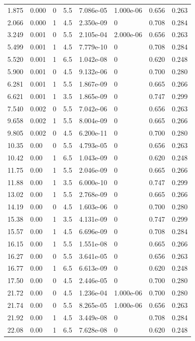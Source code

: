 \documentclass[preview]{standalone}
\begin{document}
{{\begin{tabular}{L{1.2cm}C{1.2cm} C{0.3cm}C{0.5cm} C{1.4cm}C{1.4cm} C{1.4cm}C{1.4cm}}
  1.875  &  0.000  & 0     & 5.5 &  7.086e-05  & 1.000e-06  & 0.656 &  0.263   \\ 
  2.066  &  0.000  & 1     & 4.5 &  2.350e-09  & 0  & 0.708 &  0.284   \\ 
  3.249  &  0.001  & 0     & 5.5 &  2.105e-04  & 2.000e-06  & 0.656 &  0.263   \\ 
  5.499  &  0.001  & 1     & 4.5 &  7.779e-10  & 0  & 0.708 &  0.284   \\ 
  5.520  &  0.001  & 1     & 6.5 &  1.042e-08  & 0  & 0.620 &  0.248   \\ 
  5.900  &  0.001  & 0     & 4.5 &  9.132e-06  & 0  & 0.700 &  0.280   \\ 
  6.281  &  0.001  & 1     & 5.5 &  1.867e-09  & 0  & 0.665 &  0.266   \\ 
  6.621  &  0.001  & 1     & 3.5 &  1.865e-09  & 0  & 0.747 &  0.299   \\ 
  7.540  &  0.002  & 0     & 5.5 &  7.042e-06  & 0  & 0.656 &  0.263   \\ 
  9.658  &  0.002  & 1     & 5.5 &  8.004e-09  & 0  & 0.665 &  0.266   \\ 
  9.805  &  0.002  & 0     & 4.5 &  6.200e-11  & 0  & 0.700 &  0.280   \\ 
  10.35  &  0.00  & 0     & 5.5 &  4.793e-05  & 0  & 0.656 &  0.263   \\ 
  10.42  &  0.00  & 1     & 6.5 &  1.043e-09  & 0  & 0.620 &  0.248   \\ 
  11.75  &  0.00  & 1     & 5.5 &  2.046e-09  & 0  & 0.665 &  0.266   \\ 
  11.88  &  0.00  & 1     & 3.5 &  6.000e-10  & 0  & 0.747 &  0.299   \\ 
  13.02  &  0.00  & 1     & 5.5 &  2.768e-09  & 0  & 0.665 &  0.266   \\ 
  14.19  &  0.00  & 0     & 4.5 &  1.603e-06  & 0  & 0.700 &  0.280   \\ 
  15.38  &  0.00  & 1     & 3.5 &  4.131e-09  & 0  & 0.747 &  0.299   \\ 
  15.57  &  0.00  & 1     & 4.5 &  6.696e-09  & 0  & 0.708 &  0.284   \\ 
  16.15  &  0.00  & 1     & 5.5 &  1.551e-08  & 0  & 0.665 &  0.266   \\ 
  16.27  &  0.00  & 0     & 5.5 &  3.641e-05  & 0  & 0.656 &  0.263   \\ 
  16.77  &  0.00  & 1     & 6.5 &  6.613e-09  & 0  & 0.620 &  0.248   \\ 
  17.50  &  0.00  & 0     & 4.5 &  2.446e-05  & 0  & 0.700 &  0.280   \\ 
  21.72  &  0.00  & 0     & 4.5 &  1.236e-04  & 1.000e-06  & 0.700 &  0.280   \\ 
  21.74  &  0.00  & 0     & 5.5 &  8.265e-05  & 1.000e-06  & 0.656 &  0.263   \\ 
  21.92  &  0.00  & 1     & 4.5 &  3.449e-08  & 0  & 0.708 &  0.284   \\ 
  22.08  &  0.00  & 1     & 6.5 &  7.628e-08  & 0  & 0.620 &  0.248   \\ 
\hline 
\end{tabular} 

}}
\end{document}
